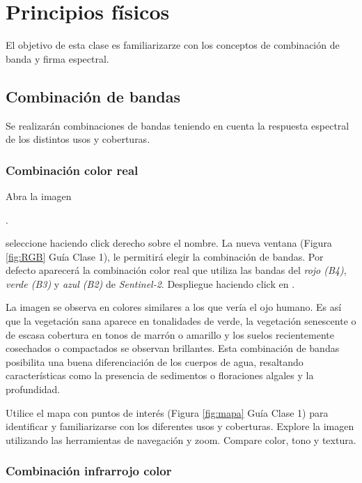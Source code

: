 \chapter{Principios físicos}

El objetivo de esta clase es familiarizarze con los conceptos de combinación de banda y firma espectral.  



\section{Combinación de bandas}
Se realizarán combinaciones de bandas teniendo en cuenta la respuesta espectral de los distintos usos y coberturas.


\subsection{Combinación color real}\label{sec:colorreal}

Abra la imagen \begin{center} .
\end{center} seleccione  haciendo click derecho sobre el nombre. La nueva ventana (Figura \ref{fig:RGB} Guía Clase 1), le permitirá elegir la combinación de bandas. Por defecto aparecerá la combinación color real que utiliza las bandas del \emph{rojo (B4)}, \emph{verde (B3)} y \emph{azul (B2)} de \emph{Sentinel-2}. Despliegue haciendo click en .

La imagen se observa en colores similares a los que vería el ojo humano. Es así que la vegetación sana aparece en tonalidades de verde, la vegetación senescente o de escasa cobertura en tonos de marrón o amarillo y los suelos recientemente cosechados o compactados se observan brillantes. Esta combinación de bandas posibilita una buena diferenciación de los cuerpos de agua, resaltando características como la presencia de sedimentos o floraciones algales y la profundidad.

Utilice el mapa con puntos de interés (Figura \ref{fig:mapa} Guía Clase 1) para identificar y familiarizarse con los diferentes usos y coberturas. Explore la imagen utilizando las herramientas de navegación y zoom. Compare color, tono y textura.


\subsection{Combinación infrarrojo color}
\label{sec:infrarrojocolor}

